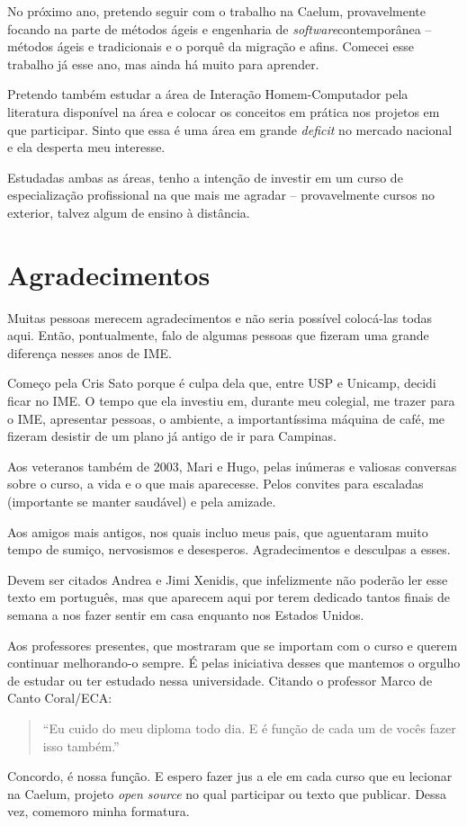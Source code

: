 \documentclass[titlepage,a4paper]{article}
\newcommand{\opensource}{\textit{open source}}
\newcommand{\software}{\textit{software}}
\begin{document}
No próximo ano, pretendo seguir com o trabalho na Caelum, provavelmente focando na parte de métodos ágeis e engenharia de \software contemporânea -- métodos ágeis e tradicionais e o porquê da migração e afins. Comecei esse trabalho já esse ano, mas ainda há muito para aprender.

Pretendo também estudar a área de Interação Homem-Computador pela literatura disponível na área e colocar os conceitos em prática nos projetos em que participar. Sinto que essa é uma área em grande \textit{deficit} no mercado nacional e ela desperta meu interesse.

Estudadas ambas as áreas, tenho a intenção de investir em um curso de especialização profissional na que mais me agradar -- provavelmente cursos no exterior, talvez algum de ensino à distância.

\section{Agradecimentos}

Muitas pessoas merecem agradecimentos e não seria possível colocá-las todas aqui. Então, pontualmente, falo de algumas pessoas que fizeram uma grande diferença nesses anos de IME. 

Começo pela Cris Sato porque é culpa dela que, entre USP e Unicamp, decidi ficar no IME. O tempo que ela investiu em, durante meu colegial, me trazer para o IME, apresentar pessoas, o ambiente, a importantíssima máquina de café, me fizeram desistir de um plano já antigo de ir para Campinas.

Aos veteranos também de 2003, Mari e Hugo, pelas inúmeras e valiosas conversas sobre o curso, a vida e o que mais aparecesse. Pelos convites para escaladas (importante se manter saudável) e pela amizade.

Aos amigos mais antigos, nos quais incluo meus pais, que aguentaram muito tempo de sumiço, nervosismos e desesperos. Agradecimentos e desculpas a esses.

Devem ser citados Andrea e Jimi Xenidis, que infelizmente não poderão ler esse texto em português, mas que aparecem aqui por terem dedicado tantos finais de semana a nos fazer sentir em casa enquanto nos Estados Unidos.

Aos professores presentes, que mostraram que se importam com o curso e querem continuar melhorando-o sempre. É pelas iniciativa desses que mantemos o orgulho de estudar ou ter estudado nessa universidade. Citando o professor Marco de Canto Coral/ECA:

\begin{quote}
	``Eu cuido do meu diploma todo dia. E é função de cada um de vocês fazer isso também.''
\end{quote}

Concordo, é nossa função. E espero fazer jus a ele em cada curso que eu lecionar na Caelum, projeto \opensource{} no qual participar ou texto que publicar. Dessa vez, comemoro minha formatura.
\end{document}
